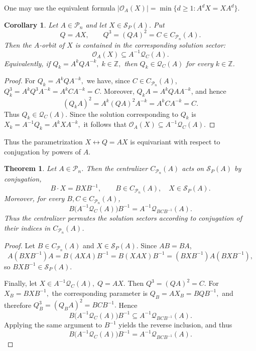 \documentclass{article}
\newtheorem{theorem}{Theorem}[section]
\newtheorem{corollary}{Corollary}[section]
\theoremstyle{definition}\newtheorem{example}{Example}[section]
\def\P{{\mathcal{P}}}
\begin{document}
	One may use the equivalent formula
	$|\mathcal O_A(X)|=\min\{d\geq 1: A^d X=XA^d\}.$
	
	\begin{corollary}\label{cor_orbits}
		Let $A\in \P_n$ and let $X\in\mathcal S_P(A)$. Put
		$$
		Q=AX,
		\qquad
		Q^3=(QA)^2=C\in C_{\P_n}(A).
		$$
		Then the $A$-orbit of $X$ is contained in the corresponding solution
		sector:
		$$
		\mathcal O_A(X)
		\subseteq
		A^{-1}\mathcal Q_C(A).
		$$
		Equivalently, if $Q_k=A^kQA^{-k},\; k\in\mathbb Z,$ then $Q_k\in\mathcal Q_C(A)$ for every $k\in\mathbb Z$.
	\end{corollary}
	
	\begin{proof}
		For $Q_k=A^kQA^{-k},$ we have, since $C\in C_{\P_n}(A)$,
		$Q_k^3=A^kQ^3A^{-k}=A^kCA^{-k}=C.$
		Moreover, $Q_kA=A^kQAA^{-k}$, and hence
		$$
		(Q_kA)^2=A^k(QA)^2A^{-k}=A^kCA^{-k}=C.
		$$
		Thus $Q_k\in\mathcal Q_C(A).$
		Since the solution corresponding to $Q_k$ is $X_k=A^{-1}Q_k=A^kXA^{-k},$
		it follows that $\mathcal O_A(X)\subseteq A^{-1}\mathcal Q_C(A).$
	\end{proof}
	
	Thus the parametrization $X\leftrightarrow Q=AX$ is equivariant with
	respect to conjugation by powers of $A$.
	
	\begin{theorem}\label{Centralizer_orbit}
		Let $A\in \P_n$. Then the centralizer $C_{\P_n}(A)$ acts on
		$\mathcal S_P(A)$ by conjugation,
		$$
		B\cdot X=BXB^{-1},
		\qquad B\in C_{\P_n}(A),\quad X\in\mathcal S_P(A).
		$$
		Moreover, for every $B,C\in C_{\P_n}(A)$,
		$$
		B\bigl(A^{-1}\mathcal Q_C(A)\bigr)B^{-1}=A^{-1}\mathcal Q_{BCB^{-1}}(A).
		$$
		Thus the centralizer permutes the solution sectors according to conjugation of their indices in $C_{\P_n}(A)$.
	\end{theorem}
	
	\begin{proof}
		Let $B\in C_{\P_n}(A)$ and $X\in\mathcal S_P(A)$. Since $AB=BA$,
		$$
			A(BXB^{-1})A=B(AXA)B^{-1}=B(XAX)B^{-1}=(BXB^{-1})A(BXB^{-1}),
		$$
		so $BXB^{-1}\in\mathcal S_P(A)$.
		
		Finally, let $X\in A^{-1}\mathcal Q_C(A),\;Q=AX.$ Then $Q^3=(QA)^2=C.$
		For $X_B=BXB^{-1},$ the corresponding parameter is $Q_B=AX_B=BQB^{-1},$
		and therefore $Q_B^3=(Q_BA)^2=BCB^{-1}.$
		Hence
		$$
		B\bigl(A^{-1}\mathcal Q_C(A)\bigr)B^{-1} \subseteq A^{-1}\mathcal Q_{BCB^{-1}}(A).
		$$
		Applying the same argument to $B^{-1}$ yields the reverse inclusion,
		and thus
		$$
		B\bigl(A^{-1}\mathcal Q_C(A)\bigr)B^{-1}
		=A^{-1}\mathcal Q_{BCB^{-1}}(A).
		$$
	\end{proof}
	
\end{document}
